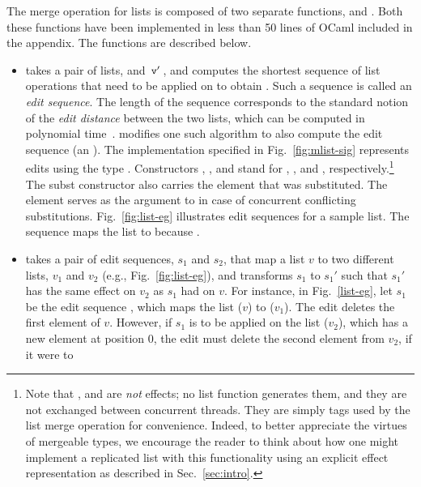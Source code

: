 The merge operation for lists is composed of two separate functions,
 and . Both these functions have been
implemented in less than 50 lines of OCaml included in the appendix.
The functions are described below.
\begin{itemize}
	\item {} takes a pair of lists,  and $\,{\tt v'}\,$, and computes
		the shortest sequence of list operations that need to be applied on 
		to obtain . Such a sequence is called an \emph{edit sequence}. The
		length of the sequence corresponds to the standard notion of the \emph{edit
		distance} between the two lists, which can be computed in polynomial
		time~\cite{wagner-fischer}.   modifies one such algorithm to
		also compute the edit sequence (an ). The implementation
		specified in Fig.~\ref{fig:mlist-sig} represents edits using the type
		.  Constructors , , and  stand for ,
		, and , respectively.\footnote{ Note that , 
		and  are \emph{not} effects; no list function generates them, and
		they are not exchanged between concurrent threads. They are simply tags
		used by the list merge operation for convenience.  Indeed, to better
		appreciate the virtues of mergeable types, we encourage the reader to
		think about how one might implement a replicated list with this
		functionality using an explicit effect representation as described in
		Sec.~\ref{sec:intro}.}  The subst constructor also carries the 
		element that was substituted. The element serves as the  argument to
		 in case of concurrent conflicting substitutions.
		Fig.~\ref{fig:list-eg} illustrates edit sequences for a sample list.  The
		sequence \C{[I(c,0); S(3,c,s)]} maps the list \C{[a;b;c]} to \C{[c;a;b;s]}
		because .
	\item  {} takes a pair of edit sequences, $s_1$ and $s_2$,
		that map a list $v$ to two different lists, $v_1$ and $v_2$ (e.g.,
		Fig.~\ref{fig:list-eg}), and transforms $s_1$ to $s_1'$ such that $s_1'$
		has the same effect on $v_2$ as $s_1$ had on $v$.  For instance, in
		Fig.~\ref{list-eg}, let $s_1$ be the edit sequence \C{[D(1); S(1,c,d)]},
		which maps the list \C{[a;b;c]} ($v$) to \C{[a;d]} ($v_1$). The  edit
		deletes the first element of $v$. However, if $s_1$ is to be applied on the
		list \C{[c;a;b;s]} ($v_2$), which has a new element at position 0, the
		 edit must delete the second element from $v_2$, if it were to

\end{itemize}
